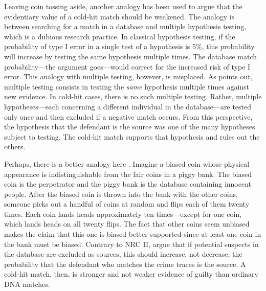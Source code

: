 \documentclass{article}
\begin{document}
Leaving coin tossing aside, another analogy has been used to argue that the evidentiary value of a cold-hit match should be weakened. The analogy is between searching for a match in a database and multiple hypothesis testing, which is a dubious research practice. In  classical hypothesis testing, if the probability of type I error in a single test of a hypothesis is 5\%, this probability will increase by testing the same hypothesis multiple times. The database match probability---the argument goes---would correct for the increased risk of type I error. This analogy with multiple testing, however, is misplaced. As \citet{balding2002DNDatabaseSearch}  points out, multiple testing consists in testing the \textit{same} hypothesis  multiple times against new evidence. In cold-hit cases, there is no such multiple testing. %
Rather, multiple hypotheses---each concerning a different individual in the database---are tested only once and then excluded if a negative match occurs. 
From this perspective, the hypothesis that the defendant is the source was one of the many hypotheses subject to testing. The cold-hit match supports that hypothesis and rules out the others. 

Perhaps, there is a better analogy here
\citep[p.\ 950]{donnelly1999DNADatabaseSearches}. Imagine a biased coin  whose physical appearance is indistinguishable from the fair coins in a piggy bank. The biased coin is the perpetrator and the
piggy bank is the database containing innocent people. 
After the biased coin is thrown into the bank with the other coins,  someone picks out a handful of coins at random and flips each of them twenty times. Each coin lands heads approximately ten times---except for one coin, which lands heads on all twenty flips. The fact that other coins seem unbiased makes the claim that this one is biased  
better supported since at least one coin in the bank must be biased. %
%
Contrary to NRC II, \cite{donnelly1999DNADatabaseSearches} argue that if potential suspects in the database are excluded as sources, this should increase, not decrease, the probability that the defendant who matches the crime traces is the source. A cold-hit match, then, is stronger and not weaker evidence of guilty than ordinary DNA matches. 
\end{document}
